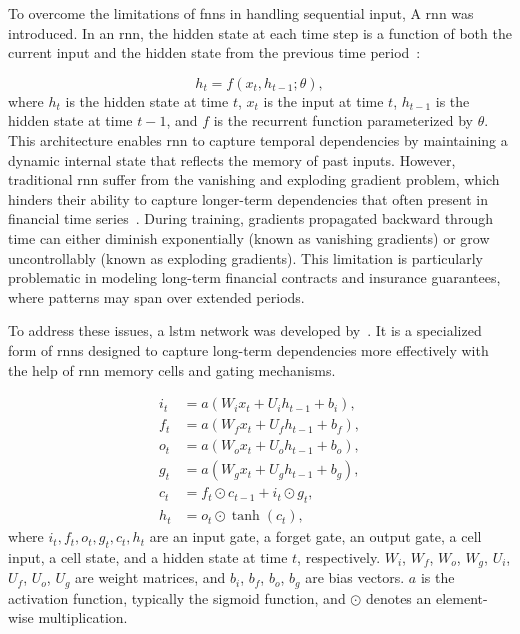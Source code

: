 To overcome the limitations of \gls{fnn}s in handling sequential input, A \gls{rnn} was introduced.
In an \gls{rnn}, the hidden state at each time step is a function of both the current input and the hidden state from the previous time period~\citep{elman1990finding}:

\begin{equation} \label{eq:rnn}
    h_t = f(x_t, h_{t-1}; \theta),
\end{equation}
where $h_t$ is the hidden state at time $t$, $x_t$ is the input at time $t$, $h_{t-1}$ is the hidden state at time $t-1$, and $f$ is the recurrent function parameterized by $\theta$.
This architecture enables \gls{rnn} to capture temporal dependencies by maintaining a dynamic internal state that reflects the memory of past inputs.
However, traditional \gls{rnn} suffer from the vanishing and exploding gradient problem, which hinders their ability to capture longer-term dependencies that often present in financial time series~\citep{bengio1994learning}.
During training, gradients propagated backward through time can either diminish exponentially (known as vanishing gradients) or grow uncontrollably (known as exploding gradients).
This limitation is particularly problematic in modeling long-term financial contracts and insurance guarantees, where patterns may span over extended periods.

To address these issues, a \gls{lstm} network was developed by~\citet{hochreiter1997long}.
It is a specialized form of \gls{rnn}s designed to capture long-term dependencies more effectively with the help of \gls{rnn} memory cells and gating mechanisms.

\begin{align} \label{eq:lstm}
    i_t &= a(W_i x_t + U_i h_{t-1} + b_i), \nonumber \\
    f_t &= a(W_f x_t + U_f h_{t-1} + b_f), \nonumber \\
    o_t &= a(W_o x_t + U_o h_{t-1} + b_o), \nonumber \\
    g_t &= a(W_g x_t + U_g h_{t-1} + b_g), \nonumber \\
    c_t &= f_t \odot c_{t-1} + i_t \odot g_t, \nonumber \\
    h_t &= o_t \odot \tanh(c_t),
\end{align}
where $i_t, f_t, o_t, g_t, c_t, h_t$ are an input gate, a forget gate, an output gate, a cell input, a cell state, and a hidden state at time $t$, respectively.
$W_i$, $W_f$, $W_o$, $W_g$, $U_i$, $U_f$, $U_o$, $U_g$ are weight matrices, and $b_i$, $b_f$, $b_o$, $b_g$ are bias vectors.
$a$ is the activation function, typically the sigmoid function, and $\odot$ denotes an element-wise multiplication.

